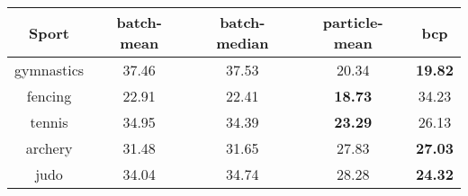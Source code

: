 \begin{tabular}{|c|c|c|c|c|}
\hline
Sport & batch-mean & batch-median & particle-mean & bcp \\
\hline
gymnastics & 37.46 & 37.53 & 20.34 & \textbf{19.82} \\
fencing & 22.91 & 22.41 & \textbf{18.73} & 34.23 \\
tennis & 34.95 & 34.39 & \textbf{23.29} & 26.13 \\
archery & 31.48 & 31.65 & 27.83 & \textbf{27.03} \\
judo & 34.04 & 34.74 & 28.28 & \textbf{24.32} \\
\hline
\end{tabular}
